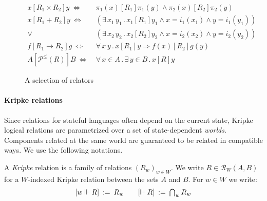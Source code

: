 \documentclass[sigplan,screen]{acmart}
\newcommand{\figsize}{\small}
\newcommand{\ifr}[1]{\mathrel{[{#1}]}}
\begin{document}
\begin{figure} %
  \figsize
  \begin{align*}
    x \ifr{R_1 \times R_2} y \ \Leftrightarrow\  &
      \pi_1(x) \ifr{R_1} \pi_1(y) \wedge
      \pi_2(x) \ifr{R_2} \pi_2(y) \\
    x \ifr{R_1 + R_2} y \ \Leftrightarrow\  &
      (\exists \, x_1 \, y_1 \,.\,
        x_1 \ifr{R_1} y_1 \wedge
        x = i_1(x_1) \wedge
        y = i_1(y_1)) \\ \vee\ &
      (\exists \, x_2 \, y_2 \,.\,
        x_2 \ifr{R_2} y_2 \wedge
        x = i_2(x_2) \wedge
        y = i_2(y_2)) \\
    f \ifr{R_1 \rightarrow R_2} g \ \Leftrightarrow\  &
      \forall \, x \, y \,.\,
        x \ifr{R_1} y \Rightarrow
        f(x) \ifr{R_2} g(y) \\
    A \ifr{\mathcal{P}^\le(R)} B \ \Leftrightarrow\  &
      \forall \, x \in A \,.\,
      \exists \, y \in B \,.\,
      x \ifr{R} y
  \end{align*}
  \caption{A selection of relators}
  \label{fig:relators}
\end{figure}


\paragraph{Kripke relations} %

Since relations for stateful languages
often depend on the current state,
Kripke logical relations
are parametrized over a set of state-dependent \emph{worlds}.
Components related at the same world
are guaranteed to be related in compatible ways.
We use the following notations.

\begin{definition} \label{def:klr} %
A \emph{Kripke} relation is
a family of relations $(R_w)_{w \in W}$.
We write $R \in \mathcal{R}_W(A, B)$
for a $W$-indexed Kripke relation between the sets $A$ and $B$.
For $w \in W$ we write:
\[
\begin{array}{c@{\qquad}c}
    [w \Vdash R] \: := \: R_w &
    [\Vdash R] \: := \: \bigcap_{w} R_w
\end{array}
\]
\end{definition}
\end{document}
